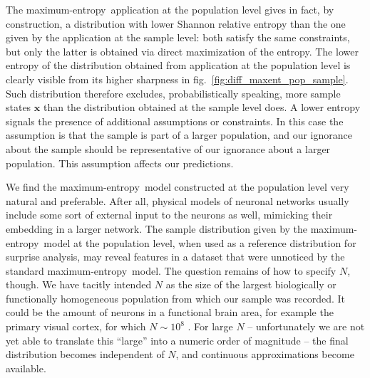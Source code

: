 \documentclass{article}
\theoremstyle{remark}
\theoremstyle{innote}
\newcommand*{\citep}{\parencites}
\renewcommand*{\cite}{\citep}
\renewcommand*{\|}{\mathpunct{|}}%
\newcommand*{\fig}{fig.}%
\theoremstyle{simple}
\newcommand*{\yxx}{x}%
\newcommand*{\yx}{\bm{\yxx}}%
\newcommand*{\me}{maximum-entropy}
\begin{document}
The \me\ application at the population level gives in fact, by
construction, a distribution with lower Shannon relative entropy than the
one given by the application at the sample level: both satisfy the same
constraints, but only the latter is obtained via direct maximization of the
entropy. The lower entropy of the distribution obtained from application at
the population level is clearly visible from its higher sharpness in
\fig~\ref{fig:diff_maxent_pop_sample}. Such distribution therefore
excludes, probabilistically speaking, more sample states $\yx$ than the
distribution obtained at the sample level does. A lower entropy signals the
presence of additional assumptions or constraints. In this case the
assumption is that the sample is part of a larger population, and our
ignorance about the sample should be representative of our ignorance about
a larger population. This assumption affects our predictions.
\fi

We find the \me\ model constructed at the population level very natural and
preferable. After all, physical models of neuronal networks usually include
some sort of external input to the neurons as well, mimicking their
embedding in a larger network. The sample distribution given by the \me\
model at the population level, when used as a reference distribution for
surprise analysis, may reveal features in a dataset that were unnoticed by
the standard \me\ model. The question remains of how to specify $N$,
though. We have tacitly intended $N$ as the size of the largest
biologically or functionally homogeneous population from which our sample
was recorded. It could be the amount of neurons in a functional brain area,
for example the primary visual cortex, for which $N\sim 10^8$
\cite{leubaetal1994}. For large $N$ -- unfortunately we are not yet able to
translate this \enquote{large} into a numeric order of magnitude -- the
final distribution becomes independent of $N$, and continuous
approximations become available.
\end{document}

